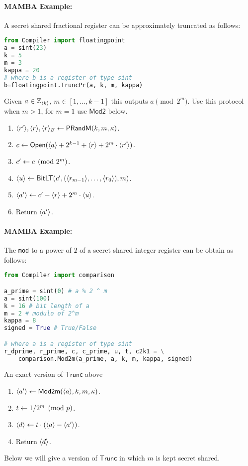 \paragraph{MAMBA Example:} A secret shared fractional register can be approximately truncated as follows: 
\begin{lstlisting}[language={python}]
from Compiler import floatingpoint
a = sint(23)
k = 5
m = 3
kappa = 20
# where b is a register of type sint
b=floatingpoint.TruncPr(a, k, m, kappa)
\end{lstlisting}

Given $a \in {\mathbb{Z}}_{\langle k \rangle}$, $m \in [1,\ldots,k-1]$ this outputs $a \pmod{2^m}$.
Use this protocol when $m>1$, for $m=1$ use $\mathsf{Mod2}$ below.
\begin{enumerate}
\item $\langle r' \rangle, \langle r \rangle, \langle r \rangle_B \leftarrow \mathsf{PRandM}(k,m,\kappa)$.
\item $c \leftarrow {\mathsf{Open}}(\langle a \rangle+2^{k-1}+\langle r \rangle+2^m \cdot \langle r' \rangle)$.
\item $c'\leftarrow c \pmod{2^m}$.
\item $\langle u \rangle \leftarrow \mathsf{BitLT}(c',(\langle r_{m-1} \rangle,\ldots,\langle r_0 \rangle),m)$.
\item $\langle a' \rangle \leftarrow c'-\langle r \rangle+2^m \cdot \langle u \rangle$.
\item Return $\langle a' \rangle$.
\end{enumerate}

\paragraph{MAMBA Example:} The \verb|mod| to a power of $2$ of a secret shared integer register can be obtain as follows: 
\begin{lstlisting}[language={python}]
from Compiler import comparison

a_prime = sint(0) # a % 2 ^ m
a = sint(100)
k = 16 # bit length of a
m = 2 # modulo of 2^m
kappa = 8 
signed = True # True/False

# where a is a register of type sint
r_dprime, r_prime, c, c_prime, u, t, c2k1 = \
    comparison.Mod2m(a_prime, a, k, m, kappa, signed)
\end{lstlisting}


An exact version of $\mathsf{Trunc}$ above
\begin{enumerate}
\item $\langle a' \rangle \leftarrow \mathsf{Mod2m}(\langle a \rangle,k,m, \kappa)$.
\item $t \leftarrow 1/2^m \pmod{p}$.
\item $\langle d \rangle \leftarrow t \cdot (\langle a \rangle-\langle a' \rangle)$.
\item Return $\langle d \rangle$.
\end{enumerate}
Below we will give a version of $\mathsf{Trunc}$ in which $m$ is kept secret shared.
